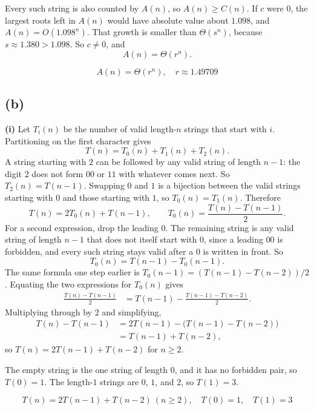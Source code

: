 \documentclass[11pt]{article}
\begin{document}
Every such string is also counted by $A(n)$, so $A(n)\ge C(n)$. If $c$ were $0$, the largest roots left in $A(n)$ would have absolute value about $1.098$, and $A(n)=O(1.098^{n})$. That growth is smaller than $\Theta(s^{n})$, because $s\approx 1.380>1.098$. So $c\neq 0$, and
\[
A(n)=\Theta(r^{n}).
\]

\[
\boxed{A(n)=\Theta(r^{n}),\quad r\approx 1.49709}
\]

\subsection*{(b)}

\textbf{(i)}
Let $T_{i}(n)$ be the number of valid length-$n$ strings that start with $i$. Partitioning on the first character gives
\[
T(n)=T_{0}(n)+T_{1}(n)+T_{2}(n).
\]
A string starting with $2$ can be followed by any valid string of length $n-1$: the digit $2$ does not form $00$ or $11$ with whatever comes next. So $T_{2}(n)=T(n-1)$. Swapping $0$ and $1$ is a bijection between the valid strings starting with $0$ and those starting with $1$, so $T_{0}(n)=T_{1}(n)$. Therefore
\[
T(n)=2T_{0}(n)+T(n-1), \qquad T_{0}(n)=\frac{T(n)-T(n-1)}{2}.
\]
For a second expression, drop the leading $0$. The remaining string is any valid string of length $n-1$ that does not itself start with $0$, since a leading $00$ is forbidden, and every such string stays valid after a $0$ is written in front. So
\[
T_{0}(n)=T(n-1)-T_{0}(n-1).
\]
The same formula one step earlier is $T_{0}(n-1)=(T(n-1)-T(n-2))/2$. Equating the two expressions for $T_{0}(n)$ gives
\begin{align*}
\frac{T(n)-T(n-1)}{2}
&= T(n-1)-\frac{T(n-1)-T(n-2)}{2}.
\end{align*}
Multiplying through by $2$ and simplifying,
\begin{align*}
T(n)-T(n-1)
&= 2T(n-1)-\bigl(T(n-1)-T(n-2)\bigr)\\
&= T(n-1)+T(n-2),
\end{align*}
so $T(n)=2T(n-1)+T(n-2)$ for $n\ge 2$.

The empty string is the one string of length $0$, and it has no forbidden pair, so $T(0)=1$. The length-$1$ strings are $0$, $1$, and $2$, so $T(1)=3$.

\[
\boxed{T(n)=2T(n-1)+T(n-2)\ (n\ge 2),\quad T(0)=1,\quad T(1)=3}
\]
\end{document}
